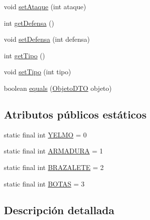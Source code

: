 \begin{DoxyCompactItemize}
\item 
void \hyperlink{classes_1_1deusto_1_1spq_1_1_t_e_scc_1_1dto_1_1_objeto_d_t_o_a7ca26a6bcd5948bc7221703dcbeb2300}{set\+Ataque} (int ataque)
\item 
int \hyperlink{classes_1_1deusto_1_1spq_1_1_t_e_scc_1_1dto_1_1_objeto_d_t_o_a22d515eb51d32bbd54705c1e659066f3}{get\+Defensa} ()
\item 
void \hyperlink{classes_1_1deusto_1_1spq_1_1_t_e_scc_1_1dto_1_1_objeto_d_t_o_abb95d763240396f72b919c009d011ce0}{set\+Defensa} (int defensa)
\item 
int \hyperlink{classes_1_1deusto_1_1spq_1_1_t_e_scc_1_1dto_1_1_objeto_d_t_o_a684f2c3ffbbd1184238a3fea22d2b7a4}{get\+Tipo} ()
\item 
void \hyperlink{classes_1_1deusto_1_1spq_1_1_t_e_scc_1_1dto_1_1_objeto_d_t_o_a95653aff4e84cc0ca85476ffde7cef76}{set\+Tipo} (int tipo)
\item 
boolean \hyperlink{classes_1_1deusto_1_1spq_1_1_t_e_scc_1_1dto_1_1_objeto_d_t_o_ad85d43fefe3f1a5f0cac0c16ceb715eb}{equals} (\hyperlink{classes_1_1deusto_1_1spq_1_1_t_e_scc_1_1dto_1_1_objeto_d_t_o}{Objeto\+D\+T\+O} objeto)
\end{DoxyCompactItemize}
\subsection*{Atributos públicos estáticos}
\begin{DoxyCompactItemize}
\item 
static final int \hyperlink{classes_1_1deusto_1_1spq_1_1_t_e_scc_1_1dto_1_1_objeto_d_t_o_a3acbd94ccfb44a3c8877419aab13f767}{Y\+E\+L\+M\+O} = 0
\item 
static final int \hyperlink{classes_1_1deusto_1_1spq_1_1_t_e_scc_1_1dto_1_1_objeto_d_t_o_a215c1f2b8e25cfbbbdab1da3e2f53b32}{A\+R\+M\+A\+D\+U\+R\+A} = 1
\item 
static final int \hyperlink{classes_1_1deusto_1_1spq_1_1_t_e_scc_1_1dto_1_1_objeto_d_t_o_a4b69180476974e67ae8d125f3e17af4e}{B\+R\+A\+Z\+A\+L\+E\+T\+E} = 2
\item 
static final int \hyperlink{classes_1_1deusto_1_1spq_1_1_t_e_scc_1_1dto_1_1_objeto_d_t_o_affff30d8d8ecf66f7b8e659e8144ce22}{B\+O\+T\+A\+S} = 3
\end{DoxyCompactItemize}


\subsection{Descripción detallada}


